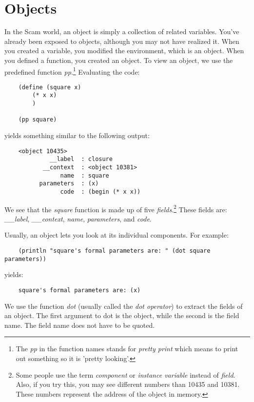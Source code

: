 \chapter{Objects}
\label{Objects}

In the Scam world, an object is simply a collection of related variables.
You've already been exposed to objects, although you may not
have realized it. When you created a variable, you modified
the environment, which is an object. When you defined a
function, you created 
an object. To view an object, we use the predefined function
{\it pp}.\footnote{
The {\it pp} in the function names stands for {\it pretty print} which
means to print out something so it is 'pretty looking'.
} Evaluating the code:

\begin{verbatim}
    (define (square x)
        (* x x)
        )
    
    (pp square)
\end{verbatim}

yields something similar to the following output:

\begin{verbatim}
    <object 10435>
             __label  : closure
           __context  : <object 10381>
                name  : square
          parameters  : (x)
                code  : (begin (* x x))
\end{verbatim}

We see that the {\it square} function is made up of five {\it fields}.\footnote{
Some people use the term {\it component} or {\it instance variable} instead
of {\it field}.
Also, if you try this, you may see different numbers than 10435 and 10381.
These numbers represent the address of the object in memory.
}
These fields are: {\it \_\_label}, {\it \_\_context}, {\it name},
{\it parameters},
and {\it code}.

Usually, an object lets you look at its individual components.
For example:

\begin{verbatim}
    (println "square's formal parameters are: " (dot square parameters))
\end{verbatim}

yields:

\begin{verbatim}
    square's formal parameters are: (x)
\end{verbatim}
    
We use the function {\it dot} (usually called the {\it dot operator}) to extract
the fields of an object. The first argument to dot is the object, while
the second is the field name. The field name does not have to be quoted.

